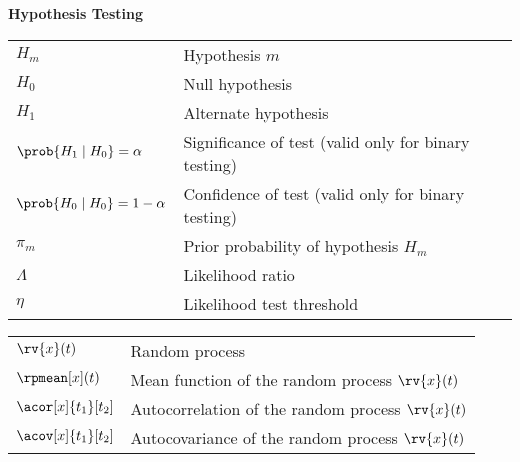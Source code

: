 {\centering
\textbf{Hypothesis Testing}
}
\begin{table}[H]
    \centering
    \begin{tabular}{p{}p{}}
        $H_{m}$  & Hypothesis $m$\\
        $H_{0}$ & Null hypothesis\\
        $H_{1}$ & Alternate hypothesis\\
        $\prob{H_{1}\mid H_{0}} = \alpha$ & Significance of test (valid only for binary testing)\\
        $\prob{H_{0}\mid H_{0}} = 1 - \alpha$ & Confidence of test (valid only for binary testing)\\
        $\pi_{m}$ & Prior probability of hypothesis $H_{m}$\\
        $\Lambda$ & Likelihood ratio\\
        $\eta$ & Likelihood test threshold
    \end{tabular}
\end{table}
%
\begin{table}[h]
    \centering
    \begin{tabular}{p{}p{}}
        $\rv{x}(t)$ & Random process\\
        $\rpmean[x](t)$   & Mean function of the random process $\rv{x}(t)$\\
        $\acor[x]{t_{1}}[t_{2}]$ & Autocorrelation of the random process $\rv{x}(t)$\\
        $\acov[x]{t_{1}}[t_{2}]$ & Autocovariance of the random process $\rv{x}(t)$
    \end{tabular}
\end{table}
